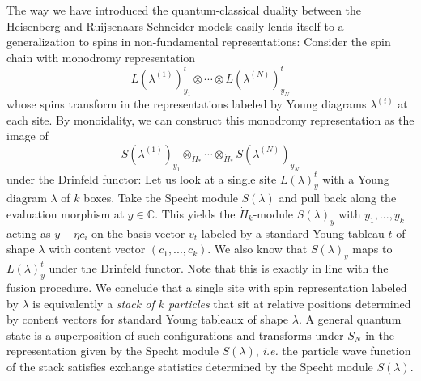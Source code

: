\documentclass[11pt]{report}
\theoremstyle{definition}
\theoremstyle{remark}
\theoremstyle{remark}
\newcommand{\C}{\mathbb{C}}
\begin{document}
The way we have introduced the quantum-classical duality between the Heisenberg and Ruijse\-naars-Schneider models easily lends itself to a generalization to spins in non-fundamental representations: Consider the spin chain with monodromy representation
\begin{equation*}
L(\lambda^{(1)})_{y_1}^t \otimes \cdots \otimes L(\lambda^{(N)})_{y_N}^t
\end{equation*}
whose spins transform in the representations labeled by Young diagrams $\lambda^{(i)}$ at each site. By monoidality, we can construct this monodromy representation as the image of
\begin{equation*}
S(\lambda^{(1)})_{y_1} \otimes_{\dot H_*} \cdots \otimes_{\dot H_*} S(\lambda^{(N)})_{y_N}
\end{equation*}
under the Drinfeld functor: Let us look at a single site $L(\lambda)_y^t$ with a Young diagram $\lambda$ of $k$ boxes. Take the Specht module $S(\lambda)$ and pull back along the evaluation morphism at $y \in \C$. This yields the $\dot H_k$-module $S(\lambda)_y$ with $y_1,...,y_k$ acting as $y - \eta c_i$ on the basis vector $v_t$ labeled by a standard Young tableau $t$ of shape $\lambda$ with content vector $(c_1,...,c_k)$. We also know that $S(\lambda)_y$ maps to $L(\lambda)_y^t$ under the Drinfeld functor. Note that this is exactly in line with the fusion procedure. We conclude that a single site with spin representation labeled by $\lambda$ is equivalently a \emph{stack of $k$ particles} that sit at relative positions determined by content vectors for standard Young tableaux of shape $\lambda$. A general quantum state is a superposition of such configurations and transforms under $S_N$ in the representation given by the Specht module $S(\lambda)$, \emph{i.e.} the particle wave function of the stack satisfies exchange statistics determined by the Specht module $S(\lambda)$.
\end{document}
